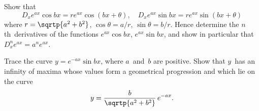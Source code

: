 Show that
\[
D_{x} e^{ax}\cos bx = re^{ax} \cos(bx + \theta),\quad
D_{x} e^{ax}\sin bx = re^{ax} \sin(bx + \theta)
\]
where $r = \sqrtp{a^{2} + b^{2}}$, $\cos\theta = a/r$, $\sin\theta = b/r$. Hence determine the $n$th~derivatives
{\Loosen of the functions $e^{ax}\cos bx$, $e^{ax}\sin bx$, and show in particular that
$D_{x}^{n} e^{ax} = a^{n} e^{ax}$.}

 Trace the curve $y = e^{-ax}\sin bx$, where $a$~and~$b$ are positive. Show
that $y$~has an infinity of maxima whose values form a geometrical progression
and which lie on the curve
\[
y = \frac{b}{\sqrtp{a^{2} + b^{2}}}\, e^{-ax}.
\]

